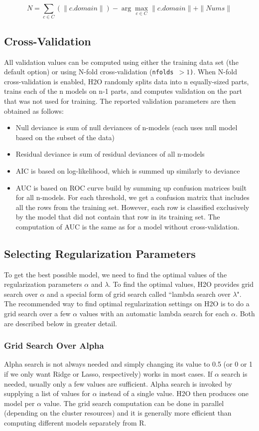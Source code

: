\documentclass{article}[11pt]
\begin{document}
$$N = \sum_{c \in C} (\|c.domain\|) - \arg\max_{c \in C} \|c.domain\| + \|Nums\| $$

\subsection{Cross-Validation}
All validation values can be computed using either the training data set (the default option) or using N-fold cross-validation (\texttt{nfolds $> 1$)}. When N-fold cross-validation is enabled, H2O randomly splits data into n equally-sized parts, trains each of the n models on n-1 parts, and computes validation on the part that was not used for training. The reported validation parameters are then obtained as follows:
\begin{itemize} 
\item Null deviance is sum of null deviances of n-models (each uses null model based on the subset of the data)
\item Residual deviance is sum of residual deviances of all n-models
\item AIC is based on log-likelihood, which is summed up similarly to deviance
\item AUC is based on ROC curve build  by summing up confusion matrices built for all n-models.
For each threshold, we get a confusion matrix that includes all the rows from
the training set. However, each row is classified exclusively by the model
that did not contain that row in its training set. The computation of AUC is the same as for a model without cross-validation. 
\end{itemize}

\subsection{Selecting Regularization Parameters}
To get the best possible model, we need to find the optimal values of the regularization parameters $\alpha$ and $\lambda$. 
To find the optimal values, H2O provides grid search over $\alpha$ and a special form of grid search called ``lambda search over $\lambda$". The recommended way to find optimal regularization settings on H2O is to do a grid search over a few $\alpha$ values with an automatic lambda search for each $\alpha$. Both are described below in greater detail. 
\subsubsection{Grid Search Over Alpha}
Alpha search is not always needed and simply changing its value to 0.5 (or 0 or 1 if we only want Ridge or Lasso, respectively) works in most cases. If $\alpha$ search is needed, usually only a few values are sufficient. Alpha search is invoked by supplying a list of values for $\alpha$ instead of a single value. H2O then produces one model per $\alpha$ value. The grid search computation can be done in parallel (depending on the cluster resources) and it is generally more efficient than computing different models separately from R. 
\end{document}
